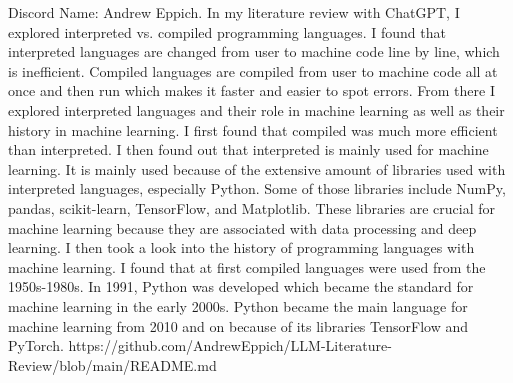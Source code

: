 \documentclass{article}
\theoremstyle{plain}
\theoremstyle{definition}
\theoremstyle{remark}
\begin{document}
Discord Name: Andrew Eppich.   
In my literature review with ChatGPT, I explored interpreted vs. compiled programming languages. I found that interpreted languages are changed from user to machine code line by line, which is inefficient. Compiled languages are compiled from user to machine code all at once and then run which makes it faster and easier to spot errors. From there I explored interpreted languages and their role in machine learning as well as their history in machine learning. I first found that compiled was much more efficient than interpreted. I then found out that interpreted is mainly used for machine learning. It is mainly used because of the extensive amount of libraries used with interpreted languages, especially Python. Some of those libraries include NumPy, pandas, scikit-learn, TensorFlow, and Matplotlib. These libraries are crucial for machine learning because they are associated with data processing and deep learning. I then took a look into the history of programming languages with machine learning. I found that at first compiled languages were used from the 1950s-1980s. In 1991, Python was developed which became the standard for machine learning in the early 2000s. Python became the main language for machine learning from 2010 and on because of its libraries TensorFlow and PyTorch. 
https://github.com/AndrewEppich/LLM-Literature-Review/blob/main/README.md

\subsection{}
\end{document}
